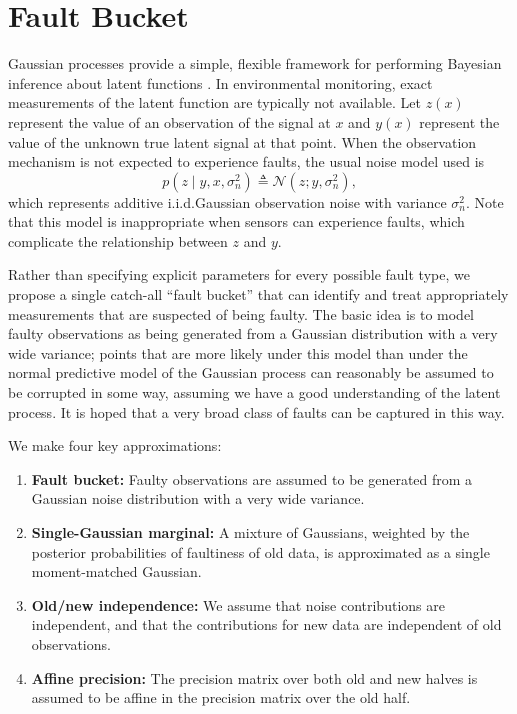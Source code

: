\documentclass{article}
\newcommand{\deq}{\ensuremath{\triangleq}}
\newcommand{\given}{\ensuremath{\mid}}
\newcommand{\cm}[1]{\ensuremath{\mathcal{#1}}}
\begin{document}
\section{Fault Bucket}\label{bucket}
Gaussian processes provide a simple, flexible framework for performing
Bayesian inference about latent functions \citep{gpml}.  In
environmental monitoring, exact measurements of the latent function
are typically not available.
Let $z(x)$ represent the value of an observation of the signal at $x$
and $y(x)$ represent the value of the unknown true latent signal at
that point.  When the observation mechanism is not expected to
experience faults, the usual noise model used is
\begin{equation}\label{iidnoise}
 p(z \given y, x, \sigma_n^2)
 \deq
 \cm{N}(z; y, \sigma_n^2),
\end{equation}
which represents additive i.i.d.\space Gaussian observation noise with
variance $\sigma_n^2$. Note that this model is inappropriate when
sensors can experience faults, which complicate the relationship
between $z$ and $y$.

Rather than specifying explicit parameters for every possible fault
type, we propose a single catch-all ``fault bucket'' that can identify
and treat appropriately measurements that are suspected of being
faulty.  The basic idea is to model faulty observations as being
generated from a Gaussian distribution with a very wide variance;
points that are more likely under this model than under the normal
predictive model of the Gaussian process can reasonably be assumed to
be corrupted in some way, assuming we have a good understanding of the
latent process. It is hoped that a very broad class of faults can be
captured in this way.

We make four key approximations:
\begin{enumerate}
 \item \label{app:fb} {\bf Fault bucket:} Faulty observations are assumed to be generated from a Gaussian noise distribution with a very wide variance.
\item \label{app:single_gaussian} {\bf Single-Gaussian marginal:} A mixture of Gaussians, weighted by the posterior probabilities of faultiness of old data, is approximated as a single moment-matched Gaussian.
\item \label{app:independence} {\bf Old/new independence:} We assume that noise contributions are independent, and that the contributions for new data are independent of old observations.
\item \label{app:affine} {\bf Affine precision:} The precision matrix over both old and new halves is assumed to be affine in the precision matrix over the old half.
\end{enumerate}
\end{document}
